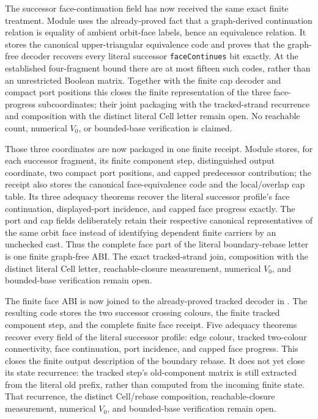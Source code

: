 \documentclass[11pt]{article}
\theoremstyle{definition}
\begin{document}
The successor face-continuation field has now received the same exact finite
treatment.  Module
uses the already-proved fact that a graph-derived continuation relation is
equality of ambient orbit-face labels, hence an equivalence relation.  It
stores the canonical upper-triangular equivalence code and proves that the
graph-free decoder recovers every literal successor
\texttt{faceContinues} bit exactly.  At the established four-fragment bound
there are at most fifteen such codes, rather than an unrestricted Boolean
matrix.  Together with the finite cap decoder and compact port positions this
closes the finite representation of the three face-progress subcoordinates;
their joint packaging with the tracked-strand recurrence and composition with
the distinct literal Cell letter remain open.  No reachable count, numerical
$V_0$, or bounded-base verification is claimed.

Those three coordinates are now packaged in one finite receipt.  Module
stores, for each successor fragment, its finite component step, distinguished
output coordinate, two compact port positions, and capped predecessor
contribution; the receipt also stores the canonical face-equivalence code and
the local/overlap cap table.  Its three adequacy theorems recover the literal
successor profile's face continuation, displayed-port incidence, and capped
face progress exactly.  The port and cap fields deliberately retain their
respective canonical representatives of the same orbit face instead of
identifying dependent finite carriers by an unchecked cast.  Thus the complete
face part of the literal boundary-rebase letter is one finite graph-free ABI.
The exact tracked-strand join, composition with the distinct literal Cell
letter, reachable-closure measurement, numerical $V_0$, and bounded-base
verification remain open.

The finite face ABI is now joined to the already-proved tracked decoder in
.
The resulting code stores the two successor crossing colours, the finite
tracked component step, and the complete finite face receipt.  Five adequacy
theorems recover every field of the literal successor profile: edge colour,
tracked two-colour connectivity, face continuation, port incidence, and
capped face progress.  This closes the finite output description of the
boundary rebase.  It does not yet close its state recurrence: the tracked
step's old-component matrix is still extracted from the literal old prefix,
rather than computed from the incoming finite state.  That recurrence, the
distinct Cell/rebase composition, reachable-closure measurement, numerical
$V_0$, and bounded-base verification remain open.
\end{document}
